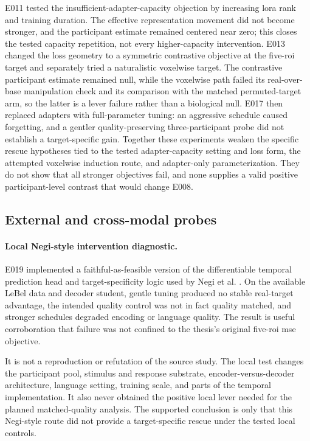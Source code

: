 E011 tested the insufficient-adapter-capacity objection by increasing \ac{lora} rank and training duration.
The effective representation movement did not become stronger, and the participant estimate remained centered near zero; this closes the tested capacity repetition, not every higher-capacity intervention.
E013 changed the loss geometry to a symmetric contrastive objective at the five-\ac{roi} target and separately tried a naturalistic voxelwise target.
The contrastive participant estimate remained null, while the voxelwise path failed its real-over-base manipulation check and its comparison with the matched permuted-target arm, so the latter is a lever failure rather than a biological null.
E017 then replaced adapters with full-parameter tuning: an aggressive schedule caused forgetting, and a gentler quality-preserving three-participant probe did not establish a target-specific gain.
Together these experiments weaken the specific rescue hypotheses tied to the tested adapter-capacity setting and loss form, the attempted voxelwise induction route, and adapter-only parameterization.
They do not show that all stronger objectives fail, and none supplies a valid positive participant-level contrast that would change E008. 

\subsection{External and cross-modal probes}

\paragraph{Local Negi-style intervention diagnostic.}
E019 implemented a faithful-as-feasible version of the differentiable temporal prediction head and target-specificity logic used by Negi et al. \autocite{negi2025}.
On the available LeBel data \autocite{lebel2023} and decoder student, gentle tuning produced no stable real-target advantage, the intended quality control was not in fact quality matched, and stronger schedules degraded encoding or language quality.
The result is useful corroboration that failure was not confined to the thesis's original five-\ac{roi} \ac{mse} objective. 

It is not a reproduction or refutation of the source study.
The local test changes the participant pool, stimulus and response substrate, encoder-versus-decoder architecture, language setting, training scale, and parts of the temporal implementation.
It also never obtained the positive local lever needed for the planned matched-quality analysis.
The supported conclusion is only that this Negi-style route did not provide a target-specific rescue under the tested local controls.


